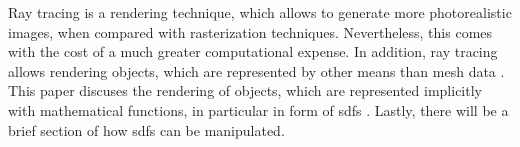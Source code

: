 

Ray tracing is a rendering technique, which allows to generate more photorealistic images, when compared with rasterization techniques. Nevertheless, this comes with the cost of a much greater computational expense. In addition, ray tracing allows rendering objects, which are represented by other means than mesh data \cite{bungartz:2013:einfuhrung}. This paper discuses the rendering of objects, which are represented implicitly with mathematical functions, in particular in form of \glspl{sdf} \cite{osher:2006:level}. Lastly, there will be a brief section of how \glspl{sdf} can be manipulated.

